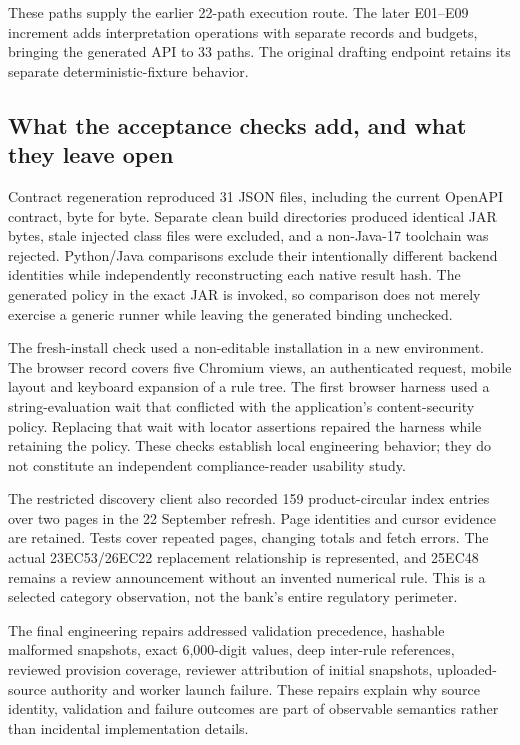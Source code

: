 \documentclass[12pt,a4paper,oneside,openany]{book}
\begin{document}
These paths supply the earlier 22-path execution route. The later E01--E09
increment adds interpretation operations with separate records and budgets,
bringing the generated API to 33 paths. The original drafting endpoint
retains its separate deterministic-fixture behavior.

\subsection{What the acceptance checks add, and what they leave open}

Contract regeneration reproduced 31 JSON files, including the current OpenAPI
contract, byte for byte. Separate clean build directories produced identical
JAR bytes, stale injected class files were excluded, and a non-Java-17 toolchain
was rejected. Python/Java comparisons exclude their intentionally different
backend identities while independently reconstructing each native result hash.
The generated policy in the exact JAR is invoked, so comparison does not merely
exercise a generic runner while leaving the generated binding unchecked.

The fresh-install check used a non-editable installation in a new environment.
The browser record covers five Chromium views, an authenticated request, mobile
layout and keyboard expansion of a rule tree. The first browser harness used a
string-evaluation wait that conflicted with the application's content-security
policy. Replacing that wait with locator assertions repaired the harness while
retaining the policy. These checks establish local engineering behavior; they
do not constitute an independent compliance-reader usability study.

The restricted discovery client also recorded 159 product-circular index
entries over two pages in the 22 September refresh. Page identities and cursor
evidence are retained. Tests cover repeated pages, changing totals and fetch
errors. The actual 23EC53/26EC22 replacement relationship is represented, and
25EC48 remains a review announcement without an invented numerical rule. This
is a selected category observation, not the bank's entire regulatory perimeter.

The final engineering repairs addressed validation precedence, hashable malformed
snapshots, exact 6,000-digit values, deep inter-rule references, reviewed provision
coverage, reviewer attribution of initial snapshots, uploaded-source authority
and worker launch failure. These repairs explain why source identity, validation
and failure outcomes are part of observable semantics rather than incidental
implementation details.
\end{document}
